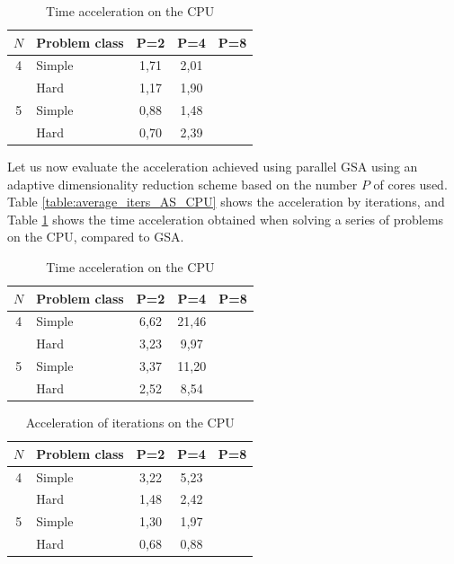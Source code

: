 \documentclass{svproc}
\begin{document}
\begin{table}
    \centering
    \begin{tabular}{|c|p{3cm}|c|c|c|}
    \hline
    \(N\) & Problem class & P=2 & P=4 & P=8 \\ \hline
    4 & Simple  & 1,71 & 2,01  &  \\ \cline{2-5}
      & Hard    & 1,17 & 1,90  &  \\ \hline
    5 & Simple  & 0,88 & 1,48  &  \\ \cline{2-5}
      & Hard    & 0,70 & 2,39  &   \\ \hline
    \end{tabular}
    \caption{Time acceleration on the CPU}
    \label{table:average_Time_AS_CPU}
\end{table}


   Let us now evaluate the acceleration achieved using parallel GSA using an adaptive dimensionality reduction scheme based on the number $P$ of cores used. Table \ref{table:average_iters_AS_CPU} shows the acceleration by iterations, and Table \ref{table:average_Time_AS_CPU} shows the time acceleration obtained when solving a series of problems on the CPU, compared to GSA.
   
\begin{table}
    \centering
    \begin{tabular}{|c|p{3cm}|c|c|c|}
    \hline
    \(N\) & Problem class & P=2 & P=4 & P=8 \\ \hline
    4 & Simple &   6,62 & 21,46  &  \\ \cline{2-5}
      & Hard   &   3,23 & 9,97  &  \\ \hline
    5 & Simple &   3,37 & 11,20  &  \\ \cline{2-5}
      & Hard   &   2,52 & 8,54  &   \\ \hline
    \end{tabular}
    \caption{Time acceleration on the CPU}
    \label{table:average_iters_MMAS_CPU}
\end{table}

\begin{table}
    \centering
    \begin{tabular}{|c|p{3cm}|c|c|c|}
    \hline
    \(N\) & Problem class & P=2 & P=4 & P=8 \\ \hline
    4 & Simple &   3,22 & 5,23  &  \\ \cline{2-5}
      & Hard   &   1,48 & 2,42  &  \\ \hline
    5 & Simple &   1,30 & 1,97  &  \\ \cline{2-5}
      & Hard   &   0,68 & 0,88  &   \\ \hline
    \end{tabular}
    \caption{Acceleration of iterations on the CPU}
    \label{table:average_Time_MMAS_CPU}
\end{table}
   
\end{document}
